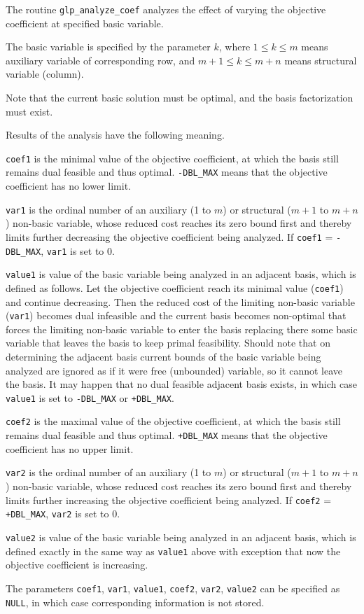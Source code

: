 \description

The routine \verb|glp_analyze_coef| analyzes the effect of varying the
objective coefficient at specified basic variable.

The basic variable is specified by the parameter $k$, where
$1\leq k\leq m$ means auxiliary variable of corresponding row, and
$m+1\leq k\leq m+n$ means structural variable (column).

Note that the current basic solution must be optimal, and the basis
factorization must exist.

Results of the analysis have the following meaning.

\verb|coef1| is the minimal value of the objective coefficient, at
which the basis still remains dual feasible and thus optimal.
\verb|-DBL_MAX| means that the objective coefficient has no lower
limit.

\verb|var1| is the ordinal number of an auxiliary (1 to $m$) or
structural ($m+1$ to $m+n$) non-basic variable, whose reduced cost
reaches its zero bound first and thereby limits further decreasing the
objective coefficient being analyzed.
If \verb|coef1| = \verb|-DBL_MAX|, \verb|var1| is set to 0.

\verb|value1| is value of the basic variable being analyzed in an
adjacent basis, which is defined as follows. Let the objective
coefficient reach its minimal value (\verb|coef1|) and continue
decreasing. Then the reduced cost of the limiting non-basic variable
(\verb|var1|) becomes dual infeasible and the current basis becomes
non-optimal that forces the limiting non-basic variable to enter the
basis replacing there some basic variable that leaves the basis to keep
primal feasibility. Should note that on determining the adjacent basis
current bounds of the basic variable being analyzed are ignored as if
it were free (unbounded) variable, so it cannot leave the basis. It may
happen that no dual feasible adjacent basis exists, in which case
\verb|value1| is set to \verb|-DBL_MAX| or \verb|+DBL_MAX|.

\verb|coef2| is the maximal value of the objective coefficient, at
which the basis still remains dual feasible and thus optimal.
\verb|+DBL_MAX| means that the objective coefficient has no upper
limit.

\verb|var2| is the ordinal number of an auxiliary (1 to $m$) or
structural ($m+1$ to $m+n$) non-basic variable, whose reduced cost
reaches its zero bound first and thereby limits further increasing the
objective coefficient being analyzed.
If \verb|coef2| = \verb|+DBL_MAX|, \verb|var2| is set to 0.

\verb|value2| is value of the basic variable being analyzed in an
adjacent basis, which is defined exactly in the same way as
\verb|value1| above with exception that now the objective coefficient
is increasing.

The parameters \verb|coef1|, \verb|var1|, \verb|value1|, \verb|coef2|,
\verb|var2|, \verb|value2| can be specified as \verb|NULL|, in which
case corresponding information is not stored.

